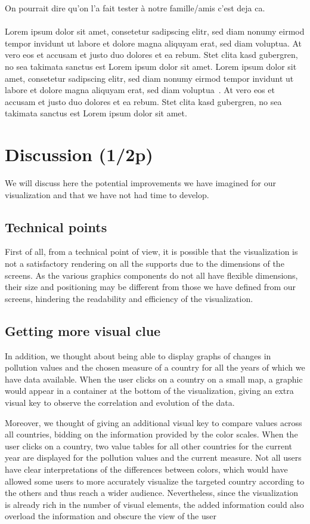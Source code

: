 \documentclass[preprint,journal]{vgtc}       %
\begin{document}
	On pourrait dire qu'on l'a fait tester à notre famille/amis c'est deja ca.\\
	~\\
	Lorem ipsum dolor sit amet, consetetur sadipscing elitr, sed diam
	nonumy eirmod tempor invidunt ut labore et dolore magna aliquyam erat,
	sed diam voluptua. At vero eos et accusam et justo duo dolores et ea
	rebum. Stet clita kasd gubergren, no sea takimata sanctus est Lorem
	ipsum dolor sit amet. Lorem ipsum dolor sit amet, consetetur
	sadipscing elitr, sed diam nonumy eirmod tempor invidunt ut labore et
	dolore magna aliquyam erat, sed diam
	voluptua~\cite{Kitware:2003,Max:1995:OMF}. At vero eos et accusam et
	justo duo dolores et ea rebum. Stet clita kasd gubergren, no sea
	takimata sanctus est Lorem ipsum dolor sit amet. 

\section{Discussion (1/2p)}

We will discuss here the potential improvements we have imagined for our visualization and that we have not had time to develop. 
\newline


\subsection{Technical points}
First of all, from a technical point of view, it is possible that the visualization is not a satisfactory rendering on all the supports due to the dimensions of the screens. As the various graphics components do not all have flexible dimensions, their size and positioning may be different from those we have defined from our screens, hindering the readability and efficiency of the visualization. 


\subsection{Getting more visual clue}
In addition, we thought about being able to display graphs of changes in pollution values ​​and the chosen measure of a country for all the years of which we have data available. When the user clicks on a country on a small map, a graphic would appear in a container at the bottom of the visualization, giving an extra visual key to observe the correlation and evolution of the data. 

Moreover, we thought of giving an additional visual key to compare values ​​across all countries, bidding on the information provided by the color scales. When the user clicks on a country, two value tables for all other countries for the current year are displayed for the pollution values ​​and the current measure. Not all users have clear interpretations of the differences between colors, which would have allowed some users to more accurately visualize the targeted country according to the others and thus reach a wider audience. Nevertheless, since the visualization is already rich in the number of visual elements, the added information could also overload the information and obscure the view of the user
\end{document}
